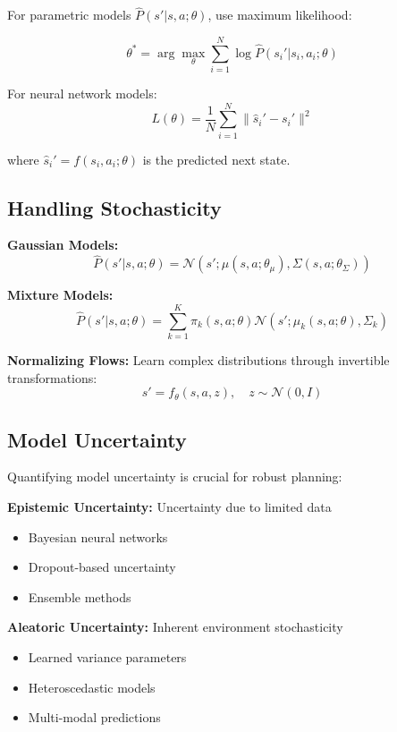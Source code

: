 For parametric models $\hat{P}(s'|s,a; \theta)$, use maximum likelihood:

\begin{equation}
\theta^* = \arg\max_\theta \sum_{i=1}^N \log \hat{P}(s_i'|s_i, a_i; \theta)
\end{equation}

For neural network models:
\begin{equation}
L(\theta) = \frac{1}{N} \sum_{i=1}^N \|\hat{s}_i' - s_i'\|^2
\end{equation}

where $\hat{s}_i' = f(s_i, a_i; \theta)$ is the predicted next state.

\subsection{Handling Stochasticity}

\textbf{Gaussian Models:}
\begin{equation}
\hat{P}(s'|s,a; \theta) = \mathcal{N}(s'; \mu(s,a; \theta_\mu), \Sigma(s,a; \theta_\Sigma))
\end{equation}

\textbf{Mixture Models:}
\begin{equation}
\hat{P}(s'|s,a; \theta) = \sum_{k=1}^K \pi_k(s,a; \theta) \mathcal{N}(s'; \mu_k(s,a; \theta), \Sigma_k)
\end{equation}

\textbf{Normalizing Flows:}
Learn complex distributions through invertible transformations:
\begin{equation}
s' = f_{\theta}(s, a, z), \quad z \sim \mathcal{N}(0, I)
\end{equation}

\subsection{Model Uncertainty}

Quantifying model uncertainty is crucial for robust planning:

\textbf{Epistemic Uncertainty:} Uncertainty due to limited data
\begin{itemize}
    \item Bayesian neural networks
    \item Dropout-based uncertainty
    \item Ensemble methods
\end{itemize}

\textbf{Aleatoric Uncertainty:} Inherent environment stochasticity
\begin{itemize}
    \item Learned variance parameters
    \item Heteroscedastic models
    \item Multi-modal predictions
\end{itemize}

